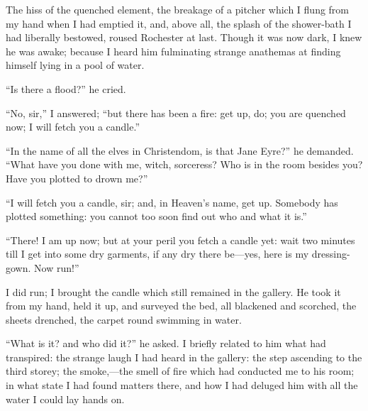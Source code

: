 The hiss of the quenched element, the breakage of a pitcher which I
flung from my hand when I had emptied it, and, above all, the splash of
the shower-bath I had liberally bestowed, roused \Mr{}  Rochester at last.
Though it was now dark, I knew he was awake; because I heard him
fulminating strange anathemas at finding himself lying in a pool of
water.

\enquote{Is there a flood?} he cried.

\enquote{No, sir,} I answered; \enquote{but there has been a fire: get
	up, do; you are quenched now; I will fetch you a candle.}

\enquote{In the name of all the elves in Christendom, is that Jane
	Eyre?} he demanded. \enquote{What have you done with me, witch,
	sorceress? Who is in the room besides you? Have you plotted to drown
	me?}

\enquote{I will fetch you a candle, sir; and, in Heaven's name, get up.
	Somebody has plotted something: you cannot too soon find out who and
	what it is.}

\enquote{There! I am up now; but at your peril you fetch a candle yet:
	wait two minutes till I get into some dry garments, if any dry there
	be---yes, here is my dressing-gown. Now run!}

I did run; I brought the candle which still remained in the gallery. He
took it from my hand, held it up, and surveyed the bed, all blackened
and scorched, the sheets drenched, the carpet round swimming in water.

\enquote{What is it? and who did it?} he asked. I briefly related to
him what had transpired: the strange laugh I had heard in the gallery:
the step ascending to the third storey; the smoke,---the smell of fire
which had conducted me to his room; in what state I had found matters
there, and how I had deluged him with all the water I could lay hands
on.

